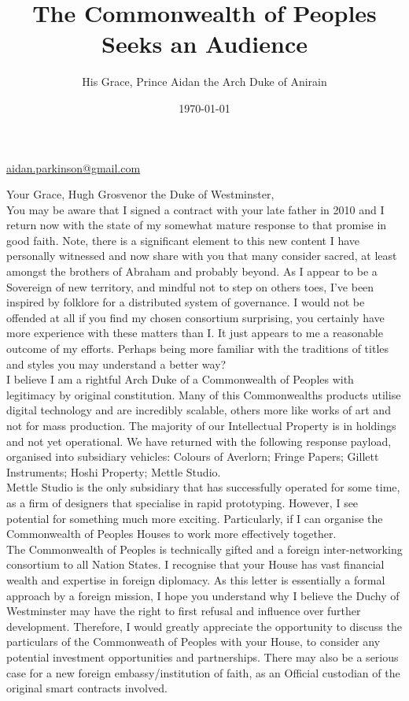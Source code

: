 \documentclass[11pt, oneside]{article}   	%
\title{The Commonwealth of Peoples Seeks an Audience}
\author{His Grace, Prince Aidan the Arch Duke of Anirain}
\date{\today}							%
\begin{document}
\maketitle
\begin{center}
\href{mailto:aidan.parkinson@gmail.com}{aidan.parkinson@gmail.com}
\end{center}

Your Grace, Hugh Grosvenor the Duke of Westminster,\\

You may be aware that I signed a contract with your late father in 2010 and I return now with the state of my somewhat mature response to that promise in good faith.
Note, there is a significant element to this new content I have personally witnessed and now share with you that many consider sacred, at least amongst the brothers of Abraham and probably beyond.
As I appear to be a Sovereign of new territory, and mindful not to step on others toes, I've been inspired by folklore for a distributed system of governance.
I would not be offended at all if you find my chosen consortium surprising, you certainly have more experience with these matters than I.
It just appears to me a reasonable outcome of my efforts.
Perhaps being more familiar with the traditions of titles and styles you may understand a better way?\\

I believe I am a rightful Arch Duke of a Commonwealth of Peoples with legitimacy by original constitution.
Many of this Commonwealths products utilise digital technology and are incredibly scalable, others more like works of art and not for mass production.
The majority of our Intellectual Property is in holdings and not yet operational.
We have returned with the following response payload, organised into subsidiary vehicles: Colours of Averlorn; Fringe Papers; Gillett Instruments; Hoshi Property; Mettle Studio.\\

Mettle Studio is the only subsidiary that has successfully operated for some time, as a firm of designers that specialise in rapid prototyping.
However, I see potential for something much more exciting.
Particularly, if I can organise the Commonwealth of Peoples Houses to work more effectively together.\\

The Commonwealth of Peoples is technically gifted and a foreign inter-networking consortium to all Nation States.
I recognise that your House has vast financial wealth and expertise in foreign diplomacy.
As this letter is essentially a formal approach by a foreign mission, I hope you understand why I believe the Duchy of Westminster may have the right to first refusal and influence over further development.
Therefore, I would greatly appreciate the opportunity to discuss the particulars of the Commonweath of Peoples with your House, to consider any potential investment opportunities and partnerships.
There may also be a serious case for a new foreign embassy/institution of faith, as an Official custodian of the original smart contracts involved.\\
\end{document}
